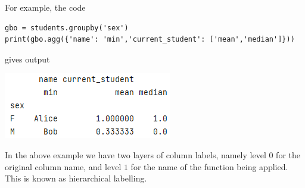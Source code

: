\documentclass[8pt]{extarticle}
\begin{document}
\begin{multicols}{4}
For example, the code
\begin{lstlisting}[style=Python]
gbo = students.groupby('sex')
print(gbo.agg({'name': 'min','current_student': ['mean','median']}))
\end{lstlisting}

gives output 

\includegraphics[scale = 0.65]{images/agg_functions.png}

In the above example we have two layers of column labels, namely level $0$ for the original column name, and level $1$ for the name of the function being applied. This is known as hierarchical labelling. 

\end{multicols}
\newpage
\thispagestyle{empty} 
\end{document}
